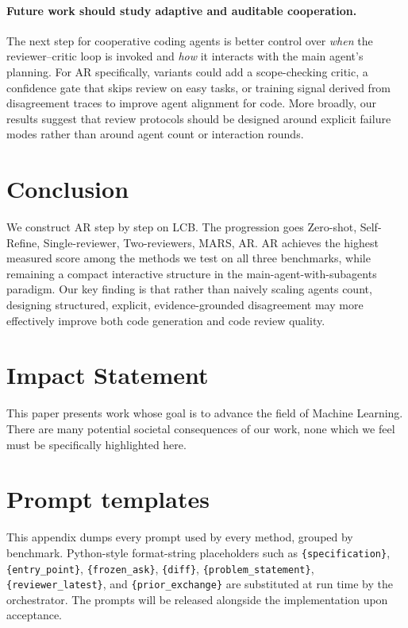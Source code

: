 \documentclass{article}
\begin{document}
\paragraph{Future work should study adaptive and auditable cooperation.}
The next step for cooperative coding agents is better control over \emph{when} the reviewer--critic loop is invoked and \emph{how} it interacts with the main agent's planning. For AR specifically, variants could add a scope-checking critic, a confidence gate that skips review on easy tasks, or training signal derived from disagreement traces to improve agent alignment for code. More broadly, our results suggest that review protocols should be designed around explicit failure modes rather than around agent count or interaction rounds.

\section{Conclusion}
\label{sec:conclusion}


We construct AR step by step on LCB. The progression goes Zero-shot,
Self-Refine, Single-reviewer, Two-reviewers, MARS, AR. AR achieves the highest measured score among the methods we test on all three benchmarks, while remaining a compact interactive structure in the main-agent-with-subagents paradigm. Our key finding is that rather than naively scaling agents count, designing structured, explicit, evidence-grounded disagreement may more effectively improve both code generation and code review quality. 

\section*{Impact Statement}
This paper presents work whose goal is to advance the field of Machine
Learning. There are many potential societal consequences of our work, none
which we feel must be specifically highlighted here.
\begingroup
\sloppy
\setlength{\emergencystretch}{2em}


\endgroup

\appendix
\onecolumn

\section{Prompt templates}
\label{app:prompts}

This appendix dumps every prompt used by every method, grouped by
benchmark. Python-style format-string placeholders such as
\texttt{\{specification\}}, \texttt{\{entry\_point\}},
\texttt{\{frozen\_ask\}}, \texttt{\{diff\}},
\texttt{\{problem\_statement\}}, \texttt{\{reviewer\_latest\}}, and
\texttt{\{prior\_exchange\}} are substituted at run time by the
orchestrator. The prompts will be released alongside the
implementation upon acceptance.
\end{document}
